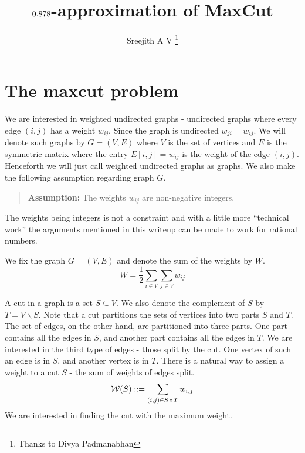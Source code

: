 \documentclass[12pt,
    driverfallback=dvipdfm,
 	openany,
    a4paper,
    toc=bibliography,
    twoside,
    numbers=noenddot]{article}              %
\title{\bf $0.878$-approximation of MaxCut}    %
\author{Sreejith A V \footnote{Thanks to Divya Padmanabhan}}              %
\date{}                           %
\begin{document}
\maketitle

\tableofcontents

\section{The maxcut problem}
We are interested in weighted undirected graphs - undirected graphs where every edge $(i,j)$ has a weight $w_{ij}$. Since the graph is undirected $w_{ji} = w_{ij}$. We will denote such graphs by $G=(V,E)$ where $V$ is the set of vertices and $E$ is the symmetric matrix where the entry $E[i,j] = w_{ij}$ is the weight of the edge $(i,j)$. Henceforth we will just call weighted undirected graphs as graphs.  We also make the following assumption regarding graph $G$.
\begin{quote}
{\bf Assumption:} The weights $w_{ij}$ are non-negative integers.
\end{quote}
The weights being integers is not a constraint and with a little more ``technical work'' the arguments mentioned in this writeup can be made to work for rational numbers. 

We fix the graph $G=(V,E)$ and denote the sum of the weights by $W$.
\[
W = \frac{1}{2} \sum_{i \in V} \sum_{j \in V} w_{ij}
\]


A cut in a graph is a set $S \subseteq V$. We also denote the complement of $S$ by $T = V\backslash S$. Note that a cut partitions the sets of vertices into two parts $S$ and $T$. 
The set of edges, on the other hand, are partitioned into three parts. One part contains all the edges in $S$, and another part contains all the edges in $T$. We are interested in the third type of edges - those split by the cut. One vertex of such an edge is in $S$, and another vertex is in $T$. There is a natural way to assign a weight to a cut $S$ - the sum of weights of edges split.
\[ \mathcal{W}(S) ::= \sum_{(i,j) \in S \times T} w_{i,j}\]
We are interested in finding the cut with the maximum weight. 
\end{document}
